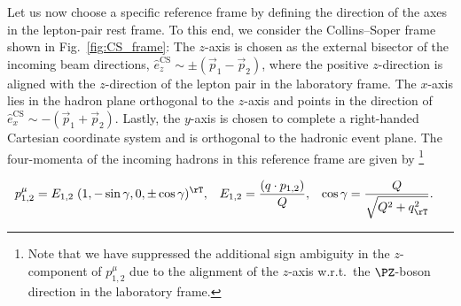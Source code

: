 Let us now choose a specific reference frame by defining the direction of the axes in the lepton-pair rest frame. 
To this end, we consider the Collins--Soper frame~\cite{Collins:1977iv} shown in Fig.~\ref{fig:CS_frame}:
The $z$-axis is chosen as the external bisector of the incoming beam directions, $\hat{e}_{z}^\mathrm{CS} \sim \pm (\vec{p}_1 - \vec{p}_2)$, where the positive $z$-direction is aligned with the $z$-direction of the lepton pair in the laboratory frame.
The $x$-axis lies in the hadron plane orthogonal to the $z$-axis and points in the direction of $\hat{e}_{x}^\mathrm{CS} \sim -(\vec{p}_1+\vec{p}_2)$. 
Lastly, the $y$-axis is chosen to complete a right-handed Cartesian coordinate system and is orthogonal to the hadronic event plane.
The four-momenta of the incoming hadrons in this reference frame are given by%
\footnote{
Note that we have suppressed the additional sign ambiguity in the $z$-component of $p_{1,2}^\mu$ 
due to the alignment of the $z$-axis w.r.t.\ the $\PZ$-boson direction in the laboratory frame.
} 

\begin{align}
  p_{1,2}^\mu &= E_{1,2} \; (1, -\sin\gamma, 0, \pm\cos\gamma)^\rT , & 
  E_{1,2} &= \frac{(q \cdot p_{1,2})}{Q} , &
  \cos\gamma &= \frac{Q}{\sqrt{Q^2 + q_\rT^2}} .
\end{align}


